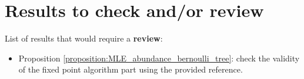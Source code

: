 \section{Results to check and/or review}

List of results that would require a \color{red}\textbf{review}\color{black}:
\begin{itemize}
    \item Proposition \ref{proposition:MLE_abundance_bernoulli_tree}: check the validity of the fixed point algorithm part using the provided reference.
\end{itemize}